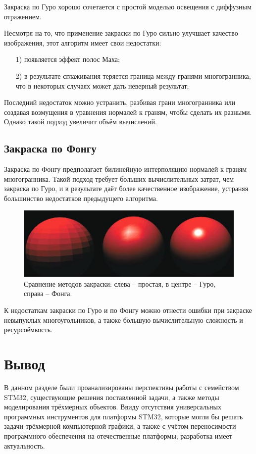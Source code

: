 Закраска по Гуро хорошо сочетается с простой моделью освещения с диффузным отражением.

Несмотря на то, что применение закраски по Гуро сильно улучшает качество изображения, этот алгоритм имеет свои недостатки:
\begin{enumerate}
	\item[1)] появляется эффект полос Маха;
	\item[2)] в результате сглаживания теряется граница между гранями многогранника, что в некоторых случаях может дать неверный результат;
\end{enumerate}

Последний недостаток можно устранить, разбивая грани многогранника или создавая возмущения в уравнения нормалей к граням, чтобы сделать их разными. Однако такой подход увеличит объём вычислений.

\subsection{Закраска по Фонгу}
Закраска по Фонгу предполагает билинейную интерполяцию нормалей к граням многогранника. Такой подход требует больших вычислительных затрат, чем закраска по Гуро, и в результате даёт более качественное изображение, устраняя большинство недостатков предыдущего алгоритма.

\begin{figure}[h]
	\centering
	\includegraphics[width=\textwidth ]{img/shading.png}
	\caption{Сравнение методов закраски: слева – простая, в центре – Гуро, справа – Фонга.}
\end{figure}

К недостаткам закраски по Гуро и по Фонгу можно отнести ошибки при закраске невыпуклых многоугольников, а также большую вычислительную сложность и ресурсоёмкость.

\section{Вывод}
В данном разделе были проанализированы перспективы работы с семейством STM32, существующие решения поставленной задачи, а также методы моделирования трёхмерных объектов. Ввиду отсутствия универсальных программных инструментов для платформы STM32, которые могли бы решать задачи трёхмерной компьютерной графики, а также с учётом переносимости программного обеспечения на отечественные платформы, разработка имеет актуальность.

